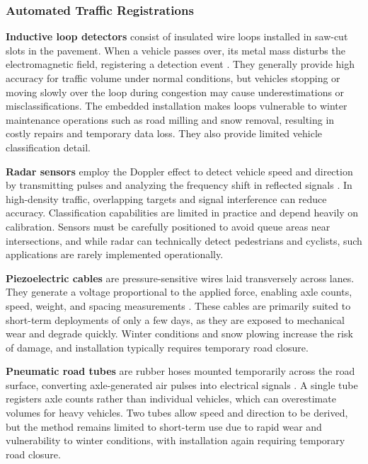 \subsubsection{Automated Traffic Registrations}

\textbf{Inductive loop detectors} consist of insulated wire loops installed in saw-cut slots in the pavement. When a vehicle passes over, its metal mass disturbs the electromagnetic field, registering a detection event \citep{SVV_V714}. They generally provide high accuracy for traffic volume under normal conditions, but vehicles stopping or moving slowly over the loop during congestion may cause underestimations or misclassifications. The embedded installation makes loops vulnerable to winter maintenance operations such as road milling and snow removal, resulting in costly repairs and temporary data loss. They also provide limited vehicle classification detail.

\textbf{Radar sensors} employ the Doppler effect to detect vehicle speed and direction by transmitting pulses and analyzing the frequency shift in reflected signals \citep{SVV_V714}. In high-density traffic, overlapping targets and signal interference can reduce accuracy. Classification capabilities are limited in practice and depend heavily on calibration. Sensors must be carefully positioned to avoid queue areas near intersections, and while radar can technically detect pedestrians and cyclists, such applications are rarely implemented operationally.

\textbf{Piezoelectric cables} are pressure-sensitive wires laid transversely across lanes. They generate a voltage proportional to the applied force, enabling axle counts, speed, weight, and spacing measurements \citep{SVV_V714}. These cables are primarily suited to short-term deployments of only a few days, as they are exposed to mechanical wear and degrade quickly. Winter conditions and snow plowing increase the risk of damage, and installation typically requires temporary road closure.

\textbf{Pneumatic road tubes} are rubber hoses mounted temporarily across the road surface, converting axle-generated air pulses into electrical signals \citep{SVV_V714}. A single tube registers axle counts rather than individual vehicles, which can overestimate volumes for heavy vehicles. Two tubes allow speed and direction to be derived, but the method remains limited to short-term use due to rapid wear and vulnerability to winter conditions, with installation again requiring temporary road closure.

